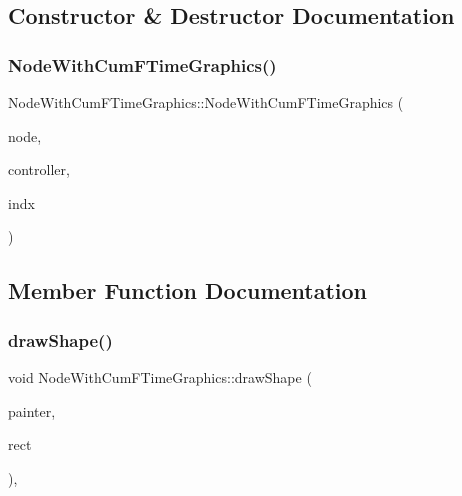 \subsection{Constructor \& Destructor Documentation}
\mbox{\label{class_node_with_cum_f_time_graphics_aab55c29ae78ca48ab28dbab9791ae83e}} 
\subsubsection{\texorpdfstring{NodeWithCumFTimeGraphics()}{NodeWithCumFTimeGraphics()}}
{\footnotesize\ttfamily Node\+With\+Cum\+F\+Time\+Graphics\+::\+Node\+With\+Cum\+F\+Time\+Graphics (\begin{DoxyParamCaption}\item[{\mbox{\hyperlink{class_node_data}{Node\+Data}} $\ast$}]{node,  }\item[{\mbox{\hyperlink{class_map_objects_controller}{Map\+Objects\+Controller}} $\ast$}]{controller,  }\item[{int}]{indx }\end{DoxyParamCaption})\hspace{0.3cm}{\ttfamily [inline]}}



\subsection{Member Function Documentation}
\mbox{\label{class_node_with_cum_f_time_graphics_a98ed08edc28f0f7a51604336dc4df650}} 
\subsubsection{\texorpdfstring{drawShape()}{drawShape()}}
{\footnotesize\ttfamily void Node\+With\+Cum\+F\+Time\+Graphics\+::draw\+Shape (\begin{DoxyParamCaption}\item[{Q\+Painter \&}]{painter,  }\item[{const qmapcontrol\+::\+Rect\+World\+Px \&}]{rect }\end{DoxyParamCaption})\hspace{0.3cm}{\ttfamily [protected]}, {\ttfamily [virtual]}}



